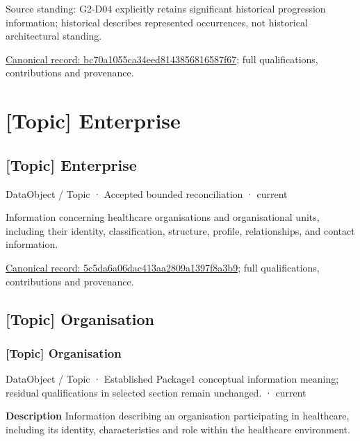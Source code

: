 Source standing: G2-D04 explicitly retains significant historical progression information; historical describes represented occurrences, not historical architectural standing.


{\footnotesize \href{../../../../continuum/application/data-object/topic/bc70a1055ca34eed8143856816587f67.md}{Canonical record: bc70a1055ca34eed8143856816587f67}; full qualifications, contributions and provenance.}\par
\section{[Topic] Enterprise}

\subsection{[Topic] Enterprise}

\label{element:5c5da6a06dac413aa2809a1397f8a3b9}
{\small DataObject / Topic · Accepted bounded reconciliation · current}\par

Information concerning healthcare organisations and organisational units, including their identity, classification, structure, profile, relationships, and contact information.


{\footnotesize \href{../../../../continuum/application/data-object/topic/5c5da6a06dac413aa2809a1397f8a3b9.md}{Canonical record: 5c5da6a06dac413aa2809a1397f8a3b9}; full qualifications, contributions and provenance.}\par
\subsection{[Topic] Organisation}

\subsubsection{[Topic] Organisation}

\label{element:dd3ba70128874caeb2d5da419d006c49}
{\small DataObject / Topic · Established Package1 conceptual information meaning; residual qualifications in selected section remain unchanged. · current}\par

\textbf{Description}
Information describing an organisation participating in healthcare, including its identity, characteristics and role within the healthcare environment.



